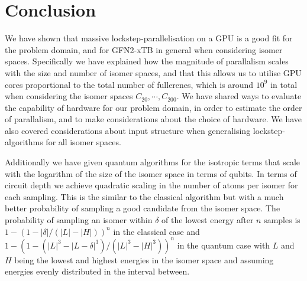 \chapter{Conclusion}\label{sec:conclusion}

We have shown that massive lockstep-parallelisation on a GPU is a good fit for the problem domain, and for GFN2-xTB in general when considering isomer spaces. Specifically we have explained how the magnitude of parallalism scales with the size and number of isomer spaces, and that this allows us to utilise GPU cores proportional to the total number of fullerenes, which is around $10^9$ in total when considering the isomer spaces \(C_{20}, \cdots, C_{200} \). We have shared ways to evaluate the capability of hardware for our problem domain, in order to estimate the order of parallalism, and to make considerations about the choice of hardware. We have also covered considerations about input structure when generalising lockstep-algorithms for all isomer spaces.

Additionally we have given quantum algorithms for the isotropic terms that scale with the logarithm of the size of the isomer space in terms of qubits. In terms of circuit depth we achieve quadratic scaling in the number of atoms per isomer for each sampling. This is the similar to the classical algorithm but with a much better probability of sampling a good candidate from the isomer space. The probability of sampling an isomer within $\delta$ of the lowest energy after $n$ samples is $1-(1-|\delta|/(|L|-|H|))^n$ in the classical case and $1-(1-(|L|^3-|L-\delta|^3)/(|L|^3-|H|^3))^n$ in the quantum case with $L$ and $H$ being the lowest and highest energies in the isomer space and assuming energies evenly distributed in the interval between.
